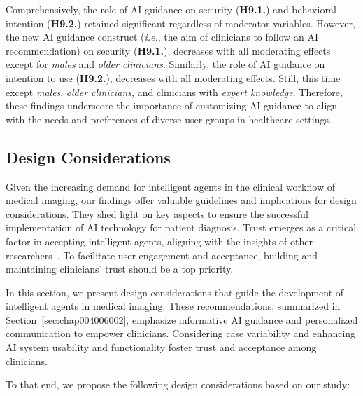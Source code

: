 Comprehensively, the role of \ac{AI} guidance on security ({\bf H9.1.}) and behavioral intention ({\bf H9.2.}) retained significant regardless of moderator variables.
However, the new \ac{AI} guidance construct ({\it i.e.}, the aim of clinicians to follow an \ac{AI} recommendation) on security ({\bf H9.1.}), decreases with all moderating effects except for {\it males} and {\it older clinicians}.
Similarly, the role of \ac{AI} guidance on intention to use ({\bf H9.2.}), decreases with all moderating effects.
Still, this time except {\it males}, {\it older clinicians}, and clinicians with {\it expert knowledge}.
Therefore, these findings underscore the importance of customizing \ac{AI} guidance to align with the needs and preferences of diverse user groups in healthcare settings.

\subsection{Design Considerations}
\label{chap:app003005002}

Given the increasing demand for intelligent agents in the clinical workflow of medical imaging, our findings offer valuable guidelines and implications for design considerations.
They shed light on key aspects to ensure the successful implementation of \ac{AI} technology for patient diagnosis.
Trust emerges as a critical factor in accepting intelligent agents, aligning with the insights of other researchers~\cite{LIU2022107026}.
To facilitate user engagement and acceptance, building and maintaining clinicians' trust should be a top priority.

In this section, we present design considerations that guide the development of intelligent agents in medical imaging.
These recommendations, summarized in Section~\ref{sec:chap004006002}, emphasize informative \ac{AI} guidance and personalized communication to empower clinicians.
Considering case variability and enhancing \ac{AI} system usability and functionality foster trust and acceptance among clinicians.

\vspace{1.50mm}

\noindent
To that end, we propose the following design considerations based on our study:

\vspace{0.05mm}


